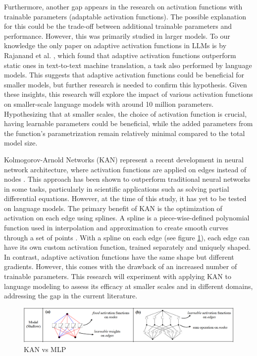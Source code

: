 Furthermore, another gap appears in the research on activation functions with trainable parameters (adaptable activation functions). The possible explanation for this could be the trade-off between additional trainable parameters and performance. However, this was primarily studied in larger models. To our knowledge the only paper on adaptive activation functions in LLMs is by Rajanand et al. \cite{Rajanand}, which found that adaptive activation functions outperform static ones in text-to-text machine translation, a task also performed by language models. This suggests that adaptive activation functions could be beneficial for smaller models, but further research is needed to confirm this hypothesis. Given these insights, this research will explore the impact of various activation functions on smaller-scale language models with around 10 million parameters. Hypothesizing that at smaller scales, the choice of activation function is crucial, having learnable parameters could be beneficial, while the added parameters from the function's parametrization remain relatively minimal compared to the total model size.

Kolmogorov-Arnold Networks (KAN) represent a recent development in neural network architecture, where activation functions are applied on edges instead of nodes \cite{Liu2024}. This approach has been shown to outperform traditional neural networks in some tasks, particularly in scientific applications such as solving partial differential equations. However, at the time of this study, it has yet to be tested on language models. The primary benefit of KAN is the optimization of activation on each edge using splines. A spline is a piece-wise-defined polynomial function used in interpolation and approximation to create smooth curves through a set of points \cite{chaudhuri_b-splines_2021}. With a spline on each edge (see figure \ref{fig:kan}), each edge can have its own custom activation function, trained separately and uniquely shaped. In contrast, adaptive activation functions have the same shape but different gradients. However, this comes with the drawback of an increased number of trainable parameters. This research will experiment with applying KAN to language modeling to assess its efficacy at smaller scales and in different domains, addressing the gap in the current literature.


\begin{figure}[ht]
    \centering
    \includegraphics[width=\columnwidth * 2]{figures/kan-network.png}
    \caption{KAN vs MLP \protect\cite{Liu2024}}
    \label{fig:kan}
\end{figure}